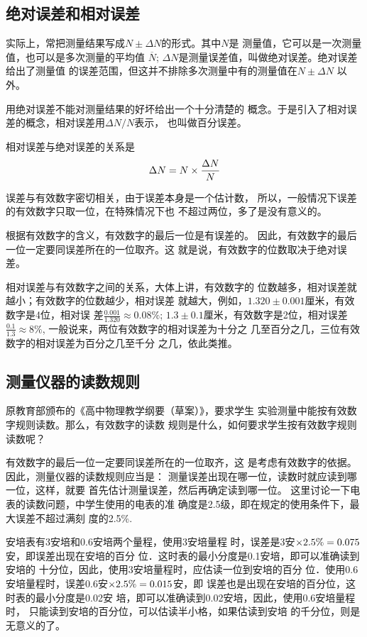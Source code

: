 \subsection{绝对误差和相对误差}
实际上，常把测量结果写成$N\pm\Delta N$的形式。其中$N$是
测量值，它可以是一次测量值，也可以是多次测量的平均值
$\overline N$; $\Delta N$是测量误差值，叫做绝对误差。绝对误差给出了测量值
的误差范围，但这并不排除多次测量中有的测量值在$N\pm\Delta N$
以外。

用绝对误差不能对测量结果的好坏给出一个十分清楚的
概念。于是引入了相对误差的概念，相对误差用$\Delta N/N$表示，
也叫做百分误差。

相对误差与绝对误差的关系是
\[\Delta N=N\times \frac{\Delta N}{N}\]

误差与有效数字密切相关，由于误差本身是一个估计数，
所以，一般情况下误差的有效数字只取一位，在特殊情况下也
不超过两位，多了是没有意义的。

根据有效数字的含义，有效数字的最后一位是有误差的。
因此，有效数字的最后一位一定要同误差所在的一位取齐。这
就是说，有效数字的位数取决于绝对误差。

相对误差与有效数字之间的关系，大体上讲，有效数字的
位数越多，相对误差就越小；有效数字的位数越少，相对误差
就越大，例如，$1.320\pm 0.001$厘米，有效数字是4位，相对误
差$\frac{0.001}{1.320}\approx 0.08\%$; $1.3\pm 0.1$厘米，有效数字是2位，相对误差$\frac{0.1}{1.3}\approx 8\%$, 一般说来，两位有效数字的相对误差为十分之
几至百分之几，三位有效数字的相对误差为百分之几至千分
之几，依此类推。

\subsection{测量仪器的读数规则}
原教育部颁布的《高中物理教学纲要（草案）》，要求学生
实验测量中能按有效数字规则读数。那么，有效数字的读数
规则是什么，如何要求学生按有效数字规则读数呢？

有效数字的最后一位一定要同误差所在的一位取齐，这
是考虑有效数字的依据。因此，测量仪器的读数规则应当是：
测量误差出现在哪一位，读数时就应读到哪一位，这样，就要
首先估计测量误差，然后再确定读到哪一位。
这里讨论一下电表的读数问题，中学生使用的电表的准
确度是2.5级，即在规定的使用条件下，最大误差不超过满刻
度的2.5\%.

安培表有3安培和0.6安培两个量程，使用3安培量程
时，误差是3安$\times2.5\%=0.075$安，即误差出现在安培的百分
位．这时表的最小分度是0.1安培，即可以准确读到安培的
十分位，因此，使用3安培量程时，应估读一位到安培的百分
位．使用0.6安培量程时，误差0.6安$\times2.5\%=0.015$安，即
误差也是出现在安培的百分位，这时表的最小分度是0.02安
培，即可以准确读到0.02安培，因此，使用0.6安培量程时，
只能读到安培的百分位，可以估读半小格，如果估读到安培
的千分位，则是无意义的了。

